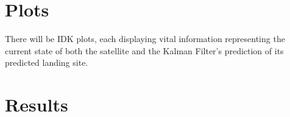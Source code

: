 \documentclass[12pt, a4paper]{article}
\begin{document}
\section{Plots}
There will be IDK plots, each displaying vital information representing the current state of both the satellite and the Kalman Filter's prediction of its predicted landing site. 

\section{Results}

\end{document}
